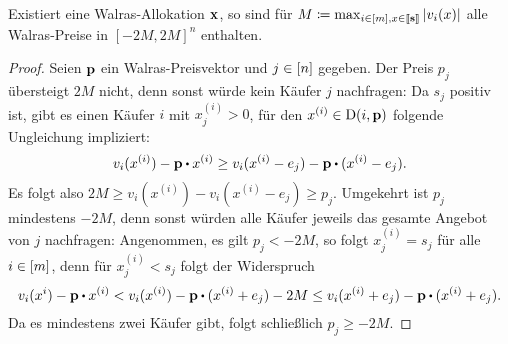 \begin{lemma}\label{lemma-prices-bounded-M}
	Existiert eine Walras-Allokation $\mathbf{x}$, so sind für $M\coloneqq \max_{i\in\left[ m \right], x\in\left\llbracket \mathbf{s} \right\rrbracket} \left\lvert v_i(x) \right\rvert$ alle Walras-Preise in $[-2M, 2M]^n$ enthalten.
\end{lemma}
\begin{proof}
	Seien $\mathbf{p}$ ein Walras-Preisvektor und $j\in\left[ n \right]$ gegeben.
	Der Preis $p_j$ übersteigt $2M$ nicht, denn sonst würde kein Käufer $j$ nachfragen:
	Da $s_j$ positiv ist, gibt es einen Käufer $i$ mit $x^{(i)}_j > 0$, für den $x^{(i)} \in\operatorname{D}(i, \mathbf{p})$ folgende Ungleichung impliziert:
	\[
	v_i(x^{(i)}) - \fp \bcdot x^{(i)} \geq v_i(x^{(i)} - e_j) - \fp \bcdot ( x^{(i)} - e_j ).
	 \]
	 Es folgt also $2M \geq v_i(x^{(i)}) - v_i(x^{(i)} - e_j) \geq p_j$.
	 Umgekehrt ist $p_j$ mindestens $-2M$, denn sonst würden alle Käufer jeweils das gesamte Angebot von $j$ nachfragen:
	 Angenommen, es gilt $p_j < -2M$, so folgt $x^{(i)}_j = s_j$ für alle $i\in\left[ m \right]$, denn für $x^{(i)}_j < s_j$ folgt der Widerspruch
	 \[ 
	 	v_i(x^{i})  - \fp \bcdot x^{(i)} < v_i(x^{(i)}) - \fp \bcdot (x^{(i)} + e_j) - 2M \leq v_i(x^{(i)} + e_j) - \fp \bcdot (x^{(i)} + e_j).
	 \]
	 Da es mindestens zwei Käufer gibt, folgt schließlich $p_j \geq -2M$.
\end{proof}


